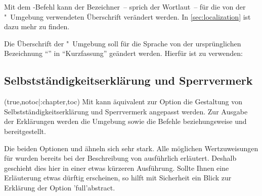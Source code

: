 \begin{DeclareEntity*}{}
\begin{DeclareEntity*}{}
\begin{DeclareEntity*}{}
%
Mit dem \KOMAScript-Befehl  kann der Bezeichner~-- 
sprich der Wortlaut~-- für die von der "~Umgebung 
verwendeten Überschrift verändert werden. In \autoref{sec:localization} ist
dazu mehr zu finden.
%
\begin{Example}
%
Die Überschrift der "~Umgebung soll für die Sprache 
 von der ursprünglichen Bezeichnung \enquote{\abstractname} in 
\enquote{Kurzfassung} geändert werden. Hierfür ist 
 zu 
verwenden:%
\begin{Code}[escapechar=§]
\end{Code}
\end{Example}



\subsection{%
  Selbstständigkeitserklärung und Sperrvermerk%
}
%
\begin{Declaration}
  {}
  (true,notoc|:chapter,toc)
\printdeclarationlist
%
Mit  kann äquivalent zur Option  die 
Gestaltung von Selbstständigkeitserklärung und Sperrvermerk angepasst werden.
Zur Ausgabe der Erklärungen werden die Umgebung  
sowie die Befehle  beziehungsweise  und 
 bereitgestellt. 

Die beiden Optionen  und  ähneln sich sehr 
stark. Alle möglichen Wertzuweisungen für  wurden bereits 
bei der Beschreibung von  ausführlich erläutert. Deshalb 
geschieht dies hier in einer etwas kürzeren Ausführung. Sollte Ihnen eine 
Erläuterung etwas dürftig erscheinen, so hilft mit Sicherheit ein Blick zur 
Erklärung der Option \Option'full'{abstract}.


\end{Declaration}
\end{DeclareEntity*}
\end{DeclareEntity*}
\end{DeclareEntity*}

